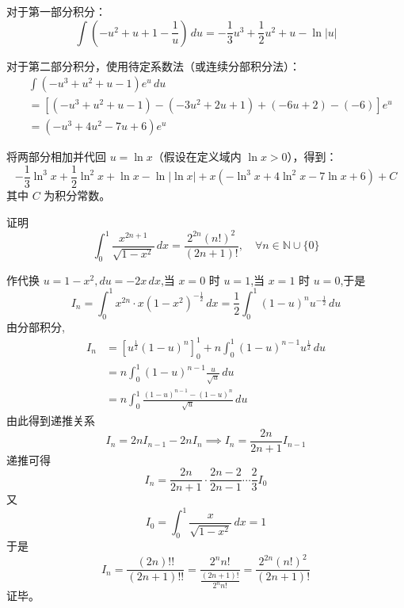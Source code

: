 \begin{questions}
\begin{solution}
对于第一部分积分：
\[
\int \left( -u^2 + u + 1 - \frac{1}{u} \right) \,du = -\frac{1}{3}u^3 + \frac{1}{2}u^2 + u - \ln|u|
\]

对于第二部分积分，使用待定系数法（或连续分部积分法）：
\begin{align*}
&\int \left( -u^3 + u^2 + u - 1 \right) e^u \,du \\
&= \left[ (-u^3 + u^2 + u - 1) - (-3u^2 + 2u + 1) + (-6u + 2) - (-6) \right] e^u \\
&= \left( -u^3 + 4u^2 - 7u + 6 \right) e^u
\end{align*}

将两部分相加并代回 $u = \ln x$（假设在定义域内 $\ln x > 0$），得到：
\[
-\frac{1}{3}\ln^3 x + \frac{1}{2}\ln^2 x + \ln x - \ln|\ln x| + x(-\ln^3 x + 4\ln^2 x - 7\ln x + 6) + C
\]
其中 $C$ 为积分常数。
\end{solution}
    \question
    证明
    \[
    \int_0^1 \frac{x^{2n+1}}{\sqrt{1-x^2}} \, dx = \frac{2^{2n}(n!)^2}{(2n+1)!}, \quad \forall n \in \mathbb{N}\cup\{0\}
    \]
    \begin{solution}
        作代换 $u=1-x^2, du=-2x \, dx$,当 $x=0$ 时 $u=1$,当 $x=1$ 时 $u=0$,于是
        \[
        I_n = \int_0^1 x^{2n} \cdot x(1-x^2)^{-\frac{1}{2}} \, dx = \frac{1}{2} \int_0^1 (1-u)^n u^{-\frac{1}{2}} \, du
        \]
        由分部积分,
        \begin{align*}
        I_n &= \left[ u^{\frac{1}{2}}(1-u)^n \right]_0^1 + n \int_0^1 (1-u)^{n-1} u^{\frac{1}{2}} \, du \\
        &= n \int_0^1 (1-u)^{n-1} \frac{u}{\sqrt{u}} \, du \\
        &= n \int_0^1 \frac{(1-u)^{n-1} - (1-u)^n}{\sqrt{u}} \, du
        \end{align*}
        由此得到递推关系
        \[
        I_n = 2n I_{n-1} - 2n I_n \implies I_n = \frac{2n}{2n+1} I_{n-1}
        \]
        递推可得
        \[
        I_n = \frac{2n}{2n+1} \cdot \frac{2n-2}{2n-1} \cdots \frac{2}{3} I_0
        \]
        又
        \[
        I_0 = \int_0^1 \frac{x}{\sqrt{1-x^2}} \, dx = 1
        \]
        于是
        \[
        I_n = \frac{(2n)!!}{(2n+1)!!} = \frac{2^n n!}{\frac{(2n+1)!}{2^n n!}} = \frac{2^{2n}(n!)^2}{(2n+1)!}
        \]
        证毕。
    \end{solution}


\end{questions}
